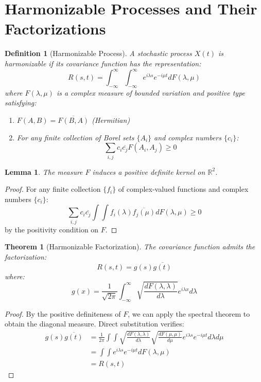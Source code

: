 \documentclass{article}
\newtheorem{definition}{Definition}
\newtheorem{theorem}{Theorem}
\newtheorem{lemma}{Lemma}
\begin{document}
\section{Harmonizable Processes and Their Factorizations}

\begin{definition}[Harmonizable Process]
A stochastic process $X(t)$ is harmonizable if its covariance function has the representation:
\[R(s,t) = \int_{-\infty}^{\infty}\int_{-\infty}^{\infty} e^{i\lambda s}e^{-i\mu t} dF(\lambda,\mu)\]
where $F(\lambda,\mu)$ is a complex measure of bounded variation and positive type satisfying:
\begin{enumerate}
    \item $F(A,B) = \overline{F(B,A)}$ (Hermitian)
    \item For any finite collection of Borel sets $\{A_i\}$ and complex numbers $\{c_i\}$:
    \[\sum_{i,j} c_i\overline{c_j}F(A_i,A_j) \geq 0\]
\end{enumerate}
\end{definition}

\begin{lemma}
The measure $F$ induces a positive definite kernel on $\mathbb{R}^2$.
\end{lemma}

\begin{proof}
For any finite collection $\{f_i\}$ of complex-valued functions and complex numbers $\{c_i\}$:
\[\sum_{i,j} c_i\overline{c_j}\int\int f_i(\lambda)\overline{f_j(\mu)}dF(\lambda,\mu) \geq 0\]
by the positivity condition on $F$.
\end{proof}

\begin{theorem}[Harmonizable Factorization]
The covariance function admits the factorization:
\[R(s,t) = g(s)\overline{g(t)}\]
where:
\[g(x) = \frac{1}{\sqrt{2\pi}}\int_{-\infty}^{\infty} \sqrt{\frac{dF(\lambda,\lambda)}{d\lambda}}e^{i\lambda x}d\lambda\]
\end{theorem}

\begin{proof}
By the positive definiteness of $F$, we can apply the spectral theorem to obtain the diagonal measure. Direct substitution verifies:
\begin{align*}
g(s)\overline{g(t)} &= \frac{1}{2\pi}\int\int \sqrt{\frac{dF(\lambda,\lambda)}{d\lambda}}\sqrt{\frac{dF(\mu,\mu)}{d\mu}}e^{i\lambda s}e^{-i\mu t}d\lambda d\mu \\
&= \int\int e^{i\lambda s}e^{-i\mu t}dF(\lambda,\mu) \\
&= R(s,t)
\end{align*}
\end{proof}
\end{document}
